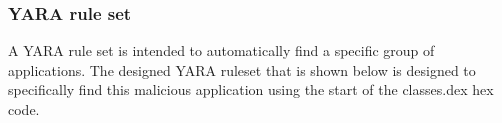\subsubsection{YARA rule set}
A YARA rule set is intended to automatically find a specific group of applications. The designed YARA ruleset that is shown below is designed to specifically find this malicious application using the start of the classes.dex hex code.

